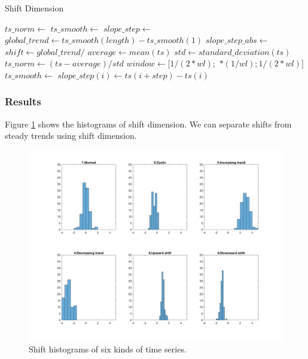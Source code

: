 \documentclass[a4paper]{article}
\begin{document}
\begin{algorithm}
\caption{Shift Dimension} \label{alg:shift}
\begin{algorithmic}[1] 

	\State $ts\_norm \gets$ 
	\State $ts\_smooth \gets$ 
	\State $slope\_step \gets$ 
	\State $global\_trend \gets ts\_smooth(length) - ts\_smooth(1)$
	\State $slope\_step\_abs \gets$ 
	\State $shift \gets global\_trend /$ 
	\State
		\State $average \gets mean(ts)$
		\State $std \gets standard\_deviation(ts)$
		\State $ts\_norm \gets (ts - average) / std$
		\State {}
	\EndFunction
	\State
		\State $window \gets [1/(2*wl);$ $*(1/wl); 1/(2*wl)]$
		\State $ts\_smooth \gets$ 
		\State {}
	\EndFunction
	\State
			\State $slope\_step(i) \gets ts(i+step) - ts(i)$
		\EndFor
		\State {}
	\EndFunction
	
\end{algorithmic}
\end{algorithm}

\subsubsection{Results}
Figure \ref{fig:shift} shows the histograms of shift dimension. We can separate shifts from steady trends using shift dimension.

\begin{figure}[htbp]
\centering
\includegraphics[width=1\textwidth]{shift.png}
\caption{\label{fig:shift}Shift histograms of six kinds of time series.}
\end{figure}
\end{document}
